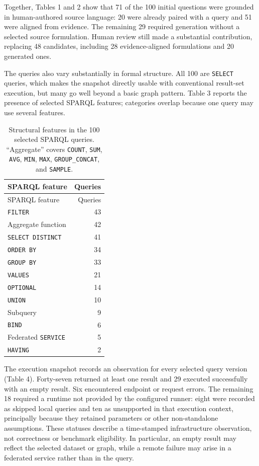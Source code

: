 Together, Tables 1 and 2 show that 71 of the 100 initial questions were grounded in human-authored source language: 20 were already paired with a query and 51 were aligned from evidence. The remaining 29 required generation without a selected source formulation. Human review still made a substantial contribution, replacing 48 candidates, including 28 evidence-aligned formulations and 20 generated ones.

The queries also vary substantially in formal structure. All 100 are \texttt{SELECT} queries, which makes the snapshot directly usable with conventional result-set execution, but many go well beyond a basic graph pattern. Table 3 reports the presence of selected SPARQL features; categories overlap because one query may use several features.

\begin{longtable}[]{@{}lr@{}}
\caption{Structural features in the 100 selected SPARQL queries. ``Aggregate'' covers \protect\texttt{COUNT}, \protect\texttt{SUM}, \protect\texttt{AVG}, \protect\texttt{MIN}, \protect\texttt{MAX}, \protect\texttt{GROUP\_CONCAT}, and \protect\texttt{SAMPLE}.}\tabularnewline
\toprule\noalign{}
SPARQL feature & Queries \\
\midrule\noalign{}
\endfirsthead
\toprule\noalign{}
SPARQL feature & Queries \\
\midrule\noalign{}
\endhead
\bottomrule\noalign{}
\endlastfoot
\texttt{FILTER} & 43 \\
Aggregate function & 42 \\
\texttt{SELECT\ DISTINCT} & 41 \\
\texttt{ORDER\ BY} & 34 \\
\texttt{GROUP\ BY} & 33 \\
\texttt{VALUES} & 21 \\
\texttt{OPTIONAL} & 14 \\
\texttt{UNION} & 10 \\
Subquery & 9 \\
\texttt{BIND} & 6 \\
Federated \texttt{SERVICE} & 5 \\
\texttt{HAVING} & 2 \\
\end{longtable}

The execution snapshot records an observation for every selected query version (Table 4). Forty-seven returned at least one result and 29 executed successfully with an empty result. Six encountered endpoint or request errors. The remaining 18 required a runtime not provided by the configured runner: eight were recorded as skipped local queries and ten as unsupported in that execution context, principally because they retained parameters or other non-standalone assumptions. These statuses describe a time-stamped infrastructure observation, not correctness or benchmark eligibility. In particular, an empty result may reflect the selected dataset or graph, while a remote failure may arise in a federated service rather than in the query.


